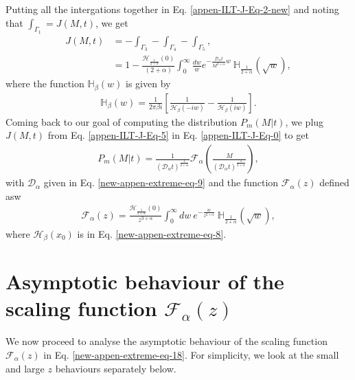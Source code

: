 \documentclass[superscriptaddress,amsmath,amssymb,aps,onecolumn]{revtex4}
\begin{document}
Putting all the intergations together in Eq. \eqref{appen-ILT-J-Eq-2-new} and noting that $\int _{\Gamma _1} = J(M,t)$, we get
\begin{align}
J(M,t) &= -\int _{\Gamma _3}-\int _{\Gamma _4}-\int _{\Gamma _5}, \\
& = 1-\frac{\mathcal{H}_{\frac{1}{2+\alpha}} \left(0 \right)}{(2+\alpha)} \int _{0}^{\infty} \frac{dw}{w} e^{-\frac{\mathcal{D}_{\alpha} t}{M^{2+\alpha}}w}~\mathbb{H}_{\frac{1}{2+\alpha}}(\sqrt{w}),
\label{appen-ILT-J-Eq-5}
\end{align}
where the function $\mathbb{H}_{\beta}(w)$ is given by
\begin{align}
\mathbb{H}_{\beta}(w)= \frac{1}{2 \pi \beta i} \left[\frac{1}{\mathcal{H}_{\beta} \left( -i w \right)}-\frac{1}{\mathcal{H}_{\beta} \left( i w \right)} \right].
\label{appen-ILT-J-Eq-6}
\end{align}
Coming back to our goal of computing the distribution $P_m(M|t)$, we plug $J(M,t)$ from Eq. \eqref{appen-ILT-J-Eq-5} in Eq. \eqref{appen-ILT-J-Eq-0} to get
\begin{align}
P_m(M|t) = \frac{1}{\left( \mathcal{D}_{\alpha} t\right)^{\frac{1}{2+\alpha}}} \mathcal{F}_{\alpha} \left( \frac{M}{\left( \mathcal{D}_{\alpha} t\right)^{\frac{1}{2+\alpha}}} \right),
\label{new-appen-ILT-J-Eq-8} 
\end{align}
with $\mathcal{D}_{\alpha}$ given in Eq. \eqref{new-appen-extreme-eq-9} and the function $\mathcal{F}_{\alpha}(z)$ defined asw
\begin{align}
 \mathcal{F}_{\alpha}(z) = \frac{\mathcal{H}_{\frac{1}{2+\alpha}} \left(0 \right)}{z^{3+\alpha}} \int _{0}^{\infty} dw ~e^{-\frac{w}{z^{2+\alpha}}} ~\mathbb{H}_{\frac{1}{2+\alpha}}(\sqrt{w}), \label{new-appen-extreme-eq-18} 
\end{align}
where $\mathcal{H}_{\beta}(x_0)$ is in Eq. \eqref{new-appen-extreme-eq-8}. 

\section{Asymptotic behaviour of the scaling function $\mathcal{F}_{\alpha}(z)$}
\label{appen-asy-PM}
We now proceed to analyse the asymptotic behaviour of the scaling function  $\mathcal{F}_{\alpha}(z)$ in Eq. \eqref{new-appen-extreme-eq-18}. For simplicity, we look at the small and large $z$ behaviours separately below.
\end{document}
